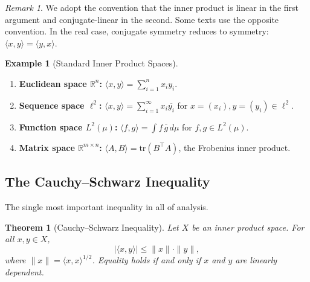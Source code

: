 \documentclass[11pt,a4paper]{article}
\theoremstyle{definition}
\newtheorem{example}{Example}[section]
\theoremstyle{plain}
\newtheorem{theorem}{Theorem}[section]
\theoremstyle{remark}
\newtheorem{remark}{Remark}[section]
\newcommand{\R}{\mathbb{R}}
\begin{document}
\begin{remark}\label{rem:convention}
We adopt the convention that the inner product is linear in the first argument
and conjugate-linear in the second. Some texts use the opposite convention.
In the real case, conjugate symmetry reduces to symmetry:
$\langle x, y \rangle = \langle y, x \rangle$.
\end{remark}

\begin{example}[Standard Inner Product Spaces]\label{ex:standard-ip}
\begin{enumerate}[label=(\alph*)]
    \item \textbf{Euclidean space $\R^n$:}
          $\langle x, y \rangle = \sum_{i=1}^n x_i y_i$.
    \item \textbf{Sequence space $\ell^2$:}
          $\langle x, y \rangle = \sum_{i=1}^\infty x_i \overline{y_i}$
          for $x = (x_i), y = (y_i) \in \ell^2$.
    \item \textbf{Function space $L^2(\mu)$:}
          $\langle f, g \rangle = \int f \,\overline{g}\, d\mu$
          for $f, g \in L^2(\mu)$.
    \item \textbf{Matrix space $\R^{m \times n}$:}
          $\langle A, B \rangle = \mathrm{tr}(B^\top A)$, the Frobenius
          inner product.
\end{enumerate}
\end{example}

\subsection{The Cauchy--Schwarz Inequality}

The single most important inequality in all of analysis.

\begin{theorem}[Cauchy--Schwarz Inequality]\label{thm:cauchy-schwarz}
Let $X$ be an inner product space. For all $x, y \in X$,
\[
    |\langle x, y \rangle| \leq \|x\| \cdot \|y\|,
\]
where $\|x\| = \langle x, x \rangle^{1/2}$. Equality holds if and only if
$x$ and $y$ are linearly dependent.
\end{theorem}
\end{document}
